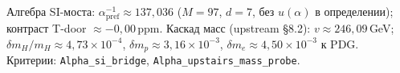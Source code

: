 Алгебра SI-моста: $\alpha^{-1}_{\mathrm{pref}}\approx137{,}036$
($M=97$, $d=7$, без $u(\alpha)$ в определении); контраст T-door $\approx -0{,}00\,$ppm.
Каскад масс (upstream §8.2): $v\approx246{,}09\,$GeV;
$\delta m_H/m_H\approx4{,}73\times 10^{-4}$,
$\delta m_p\approx3{,}16\times 10^{-3}$,
$\delta m_e\approx4{,}50\times 10^{-3}$ к PDG.
Критерии: \texttt{Alpha\_si\_bridge}, \texttt{Alpha\_upstairs\_mass\_probe}.
